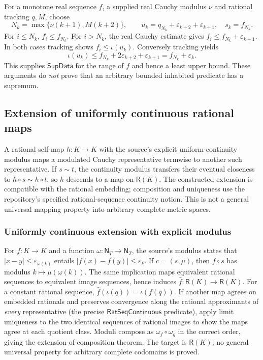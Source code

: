 \documentclass[11pt,reqno]{amsart}
\theoremstyle{definition}\newtheorem{definition}[theorem]{Definition}
\theoremstyle{remark}\newtheorem{remark}[theorem]{Remark}
\newcommand{\N}{\mathsf N_T}\newcommand{\Z}{\mathsf Z_T}\newcommand{\Q}{\mathsf Q_T}\newcommand{\RR}{\mathsf R}
\newcommand{\eps}{\varepsilon}
\begin{document}
For a monotone real sequence $f$, a supplied real Cauchy modulus $\nu$ and rational tracking $q,M$, choose
\[
N_k=\max\{\nu(k+1),M(k+2)\},\qquad
u_k=q_{N_k}+\eps_{k+2}+\eps_{k+1},\quad s_k=f_{N_k}.
\]
For $i\le N_k$, $f_i\le f_{N_k}$. For $i>N_k$, the real Cauchy estimate gives $f_i\le f_{N_k}+\eps_{k+1}$. In both cases tracking shows $f_i\le\iota(u_k)$. Conversely tracking yields
\[
\iota(u_k)\le f_{N_k}+2\eps_{k+2}+\eps_{k+1}
=f_{N_k}+\eps_k.
\]
This supplies $\mathsf{SupData}$ for the range of $f$ and hence a least upper bound. These arguments do \emph{not} prove that an arbitrary bounded inhabited predicate has a supremum.

\subsection{Extension of uniformly continuous rational maps}\label{main:sub-52}
A rational self-map $h:K\to K$ with the source's explicit uniform-continuity modulus maps a modulated Cauchy representative termwise to another such representative. If $s\sim t$, the continuity modulus transfers their eventual closeness to $h\circ s\sim h\circ t$, so $h$ descends to a map on $\RR(K)$. The constructed extension is compatible with the rational embedding; composition and uniqueness use the repository's specified rational-sequence continuity notion. This is not a general universal mapping property into arbitrary complete metric spaces.


\medskip
\subsubsection*{Uniformly continuous extension with explicit modulus}\label{supp:13-7}
For $f:K\to K$ and a function $\omega:\N\to\N$, the source's modulus states that $|x-y|\le\eps_{\omega(k)}$ entails $|f(x)-f(y)|\le\eps_k$. If $c=(s,\mu)$, then $f\circ s$ has modulus $k\mapsto\mu(\omega(k))$. The same implication maps equivalent rational sequences to equivalent image sequences, hence induces $\widehat f:\RR(K)\to\RR(K)$. For a constant rational sequence, $\widehat f(\iota(q))=\iota(f(q))$. If another map agrees on embedded rationals and preserves convergence along the rational approximants of \emph{every} representative (the precise $\mathsf{RatSeqContinuous}$ predicate), apply limit uniqueness to the two identical sequences of rational images to show the maps agree at each quotient class. Moduli compose as $\omega_f\circ\omega_g$ in the correct order, giving the extension-of-composition theorem. The target is $\RR(K)$; no general universal property for arbitrary complete codomains is proved.
\medskip
\end{document}
